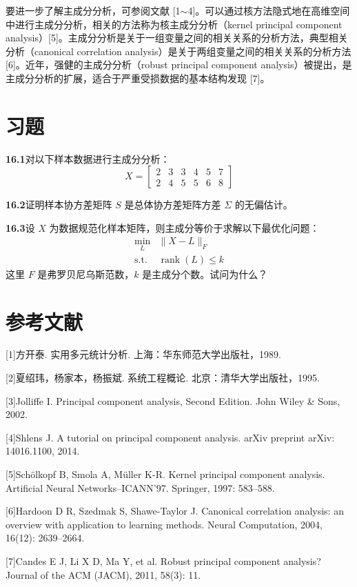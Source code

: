 \documentclass[UTF8, 12pt, fontset=fandol, oneside]{ctexart}
\begin{document}
要进一步了解主成分分析，可参阅文献 [1$\sim$4]。可以通过核方法隐式地在高维空间中进行主成分分析，相关的方法称为核主成分分析（kernel principal component analysis）[5]。主成分分析是关于一组变量之间的相关关系的分析方法，典型相关分析（canonical correlation analysis）是关于两组变量之间的相关关系的分析方法 [6]。近年，强健的主成分分析（robust principal component analysis）被提出，是主成分分析的扩展，适合于严重受损数据的基本结构发现 [7]。

\section*{习题}

\noindent\textbf{16.1}\quad 对以下样本数据进行主成分分析：
\[
X=
\begin{bmatrix}
2 & 3 & 3 & 4 & 5 & 7\\
2 & 4 & 5 & 5 & 6 & 8
\end{bmatrix}
\]

\noindent\textbf{16.2}\quad 证明样本协方差矩阵 $S$ 是总体协方差矩阵方差 $\Sigma$ 的无偏估计。

\noindent\textbf{16.3}\quad 设 $X$ 为数据规范化样本矩阵，则主成分等价于求解以下最优化问题：
\[
\begin{array}{ll}
\displaystyle\min_L & \|X-L\|_F\\[0.4em]
\mathrm{s.t.} & \operatorname{rank}(L)\leqslant k
\end{array}
\]
这里 $F$ 是弗罗贝尼乌斯范数，$k$ 是主成分个数。试问为什么？

\section*{参考文献}

[1]\quad 方开泰. 实用多元统计分析. 上海：华东师范大学出版社，1989.

[2]\quad 夏绍玮，杨家本，杨振斌. 系统工程概论. 北京：清华大学出版社，1995.

[3]\quad Jolliffe I. Principal component analysis, Second Edition. John Wiley \& Sons, 2002.

[4]\quad Shlens J. A tutorial on principal component analysis. arXiv preprint arXiv: 14016.1100, 2014.

[5]\quad Schölkopf B, Smola A, Müller K-R. Kernel principal component analysis. Artificial Neural Networks--ICANN'97. Springer, 1997: 583--588.

[6]\quad Hardoon D R, Szedmak S, Shawe-Taylor J. Canonical correlation analysis: an overview with application to learning methods. Neural Computation, 2004, 16(12): 2639--2664.

[7]\quad Candes E J, Li X D, Ma Y, et al. Robust principal component analysis? Journal of the ACM (JACM), 2011, 58(3): 11.
\end{document}
